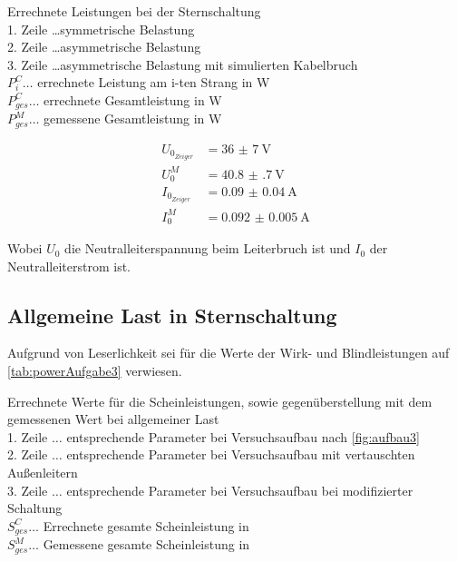 \documentclass[12pt,english,ngerman]{scrartcl}
\begin{document}
\begin{table}[H]
	\caption[Errechnete Leistungen bei der Sternschaltung]{Errechnete Leistungen bei der
		Sternschaltung                                                    \\
		1. Zeile \dots symmetrische Belastung                             \\
		2. Zeile \dots asymmetrische Belastung                            \\
		3. Zeile \dots asymmetrische Belastung mit simulierten Kabelbruch \\
		$P_i^C \dots$ errechnete Leistung am i-ten Strang in W            \\
		$P_{ges}^C \dots$ errechnete Gesamtleistung in W                  \\
		$P_{ges}^M \dots$ gemessene Gesamtleistung in W
	}
	\centering
	
\end{table}

\begin{align*}
	U_{0_{Zeiger}} & = \SI{36(7)}{\volt}      \\
	U_{0}^M        & = \SI{40.8(7)}{\volt}    \\
	I_{0_{Zeiger}} & = \SI{0.09(4)}{\ampere}  \\
	I_{0}^M        & = \SI{0.092(5)}{\ampere}
\end{align*}

Wobei $U_0$ die Neutralleiterspannung beim Leiterbruch ist und $I_0$ der
Neutralleiterstrom ist.

\subsection{Allgemeine Last in Sternschaltung}

Aufgrund von Leserlichkeit sei für die Werte der Wirk- und Blindleistungen auf
\autoref{tab:powerAufgabe3} verwiesen.

\begin{table}[H]
	\caption[Errechnete Werte für die Scheinleistungen bei allgemeiner Last] { Errechnete
		Werte für die Scheinleistungen, sowie gegenüberstellung mit dem gemessenen Wert
		bei allgemeiner Last                                            \\
		1. Zeile $\dots$ entsprechende Parameter bei Versuchsaufbau nach
		\autoref{fig:aufbau3}                                           \\
		2. Zeile $\dots$ entsprechende Parameter bei Versuchsaufbau mit vertauschten
		Außenleitern                                                    \\
		3. Zeile $\dots$ entsprechende Parameter bei Versuchsaufbau bei modifizierter
		Schaltung                                                       \\
		$S_{ges}^C \dots$ Errechnete gesamte Scheinleistung in \si{\VA} \\
		$S_{ges}^M \dots$ Gemessene gesamte Scheinleistung in \si{\VA}  \\
	}
	\centering
	
\end{table}
\end{document}
